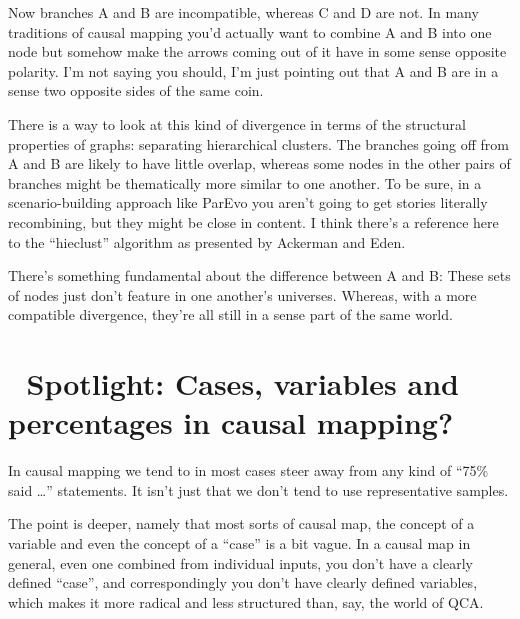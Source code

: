 \documentclass[
]{book}
\begin{document}
Now branches A and B are incompatible, whereas C and D are not. In many traditions of causal mapping you'd actually want to combine A and B into one node but somehow make the arrows coming out of it have in some sense opposite polarity. I'm not saying you should, I'm just pointing out that A and B are in a sense two opposite sides of the same coin.

There is a way to look at this kind of divergence in terms of the structural properties of graphs: separating hierarchical clusters. The branches going off from A and B are likely to have little overlap, whereas some nodes in the other pairs of branches might be thematically more similar to one another. To be sure, in a scenario-building approach like ParEvo you aren't going to get stories literally recombining, but they might be close in content. I think there's a reference here to the ``hieclust'' algorithm as presented by Ackerman and Eden.

There's something fundamental about the difference between A and B: These sets of nodes just don't feature in one another's universes. Whereas, with a more compatible divergence, they're all still in a sense part of the same world.

\hypertarget{spotlight-cases-variables-and-percentages-in-causal-mapping}{%
\chapter{🧠 Spotlight: Cases, variables and percentages in causal mapping?}\label{spotlight-cases-variables-and-percentages-in-causal-mapping}}

In causal mapping we tend to in most cases steer away from any kind of ``75\% said \ldots{}'' statements. It isn't just that we don't tend to use representative samples.

The point is deeper, namely that most sorts of causal map, the concept of a variable and even the concept of a ``case'' is a bit vague. In a causal map in general, even one combined from individual inputs, you don't have a clearly defined ``case'', and correspondingly you don't have clearly defined variables, which makes it more radical and less structured than, say, the world of QCA.
\end{document}

